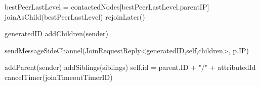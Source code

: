 \begin{algorithm}
\begin{algorithmic}[1]
    \asdupon[JoinRequestTimeout(p)]
            \State bestPeerLastLevel = contactedNodes[bestPeerLastLevel.parentIP]
            \State joinAsChild(bestPeerLastLevel)
        \Else
            \State rejoinLater()
        \EndIf
    \asdend

        \State generatedID \asdassign addChildren(sender) 

        \State sendMessageSideChannel(JoinRequestReply<generatedID,self,children>, p.IP)
    \asdend
        
        \State addParent(sender) 
        \State addSiblings(siblings) 
        \State self.id = parent.ID + "/" + attributedId
        \State cancelTimer(joinTimeoutTimerID)
    \asdend
\end{algorithmic}
\end{algorithm}
